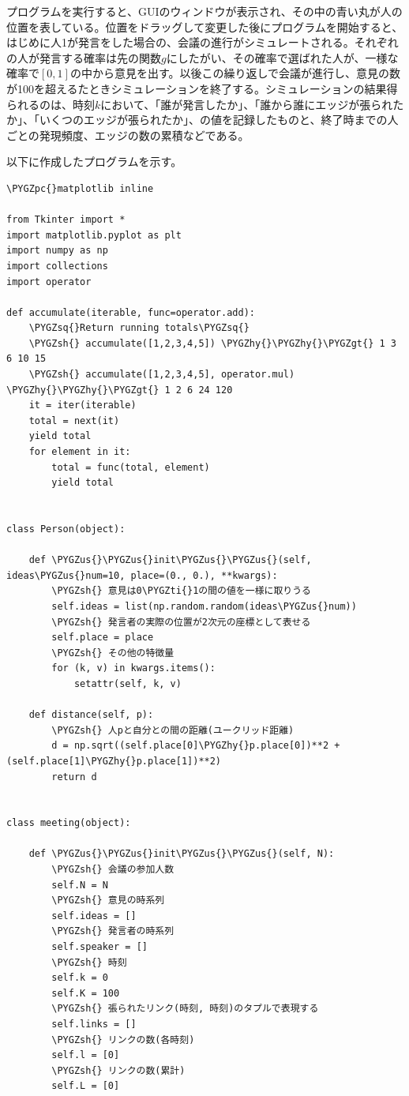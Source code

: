 \documentclass[letterpaper,10pt,english]{sphinxmanual}
\def\PYGZus{\char`\_}
\def\PYGZgt{\char`\>}
\def\PYGZsh{\char`\#}
\def\PYGZpc{\char`\%}
\def\PYGZhy{\char`\-}
\def\PYGZsq{\char`\'}
\def\PYGZti{\char`\~}
\begin{document}
プログラムを実行すると、GUIのウィンドウが表示され、その中の青い丸が人の位置を表している。位置をドラッグして変更した後にプログラムを開始すると、はじめに人1が発言をした場合の、会議の進行がシミュレートされる。それぞれの人が発言する確率は先の関数\(g\)にしたがい、その確率で選ばれた人が、一様な確率で\([0,1]\)の中から意見を出す。以後この繰り返しで会議が進行し、意見の数が100を超えるたときシミュレーションを終了する。シミュレーションの結果得られるのは、時刻\(k\)において、「誰が発言したか」、「誰から誰にエッジが張られたか」、「いくつのエッジが張られたか」、の値を記録したものと、終了時までの人ごとの発現頻度、エッジの数の累積などである。

以下に作成したプログラムを示す。

\begin{Verbatim}[commandchars=\\\{\}]
\PYGZpc{}matplotlib inline

from Tkinter import *
import matplotlib.pyplot as plt
import numpy as np
import collections
import operator

def accumulate(iterable, func=operator.add):
    \PYGZsq{}Return running totals\PYGZsq{}
    \PYGZsh{} accumulate([1,2,3,4,5]) \PYGZhy{}\PYGZhy{}\PYGZgt{} 1 3 6 10 15
    \PYGZsh{} accumulate([1,2,3,4,5], operator.mul) \PYGZhy{}\PYGZhy{}\PYGZgt{} 1 2 6 24 120
    it = iter(iterable)
    total = next(it)
    yield total
    for element in it:
        total = func(total, element)
        yield total


class Person(object):

    def \PYGZus{}\PYGZus{}init\PYGZus{}\PYGZus{}(self, ideas\PYGZus{}num=10, place=(0., 0.), **kwargs):
        \PYGZsh{} 意見は0\PYGZti{}1の間の値を一様に取りうる
        self.ideas = list(np.random.random(ideas\PYGZus{}num))
        \PYGZsh{} 発言者の実際の位置が2次元の座標として表せる
        self.place = place
        \PYGZsh{} その他の特徴量
        for (k, v) in kwargs.items():
            setattr(self, k, v)

    def distance(self, p):
        \PYGZsh{} 人pと自分との間の距離(ユークリッド距離)
        d = np.sqrt((self.place[0]\PYGZhy{}p.place[0])**2 + (self.place[1]\PYGZhy{}p.place[1])**2)
        return d


class meeting(object):

    def \PYGZus{}\PYGZus{}init\PYGZus{}\PYGZus{}(self, N):
        \PYGZsh{} 会議の参加人数
        self.N = N
        \PYGZsh{} 意見の時系列
        self.ideas = []
        \PYGZsh{} 発言者の時系列
        self.speaker = []
        \PYGZsh{} 時刻
        self.k = 0
        self.K = 100
        \PYGZsh{} 張られたリンク(時刻, 時刻)のタプルで表現する
        self.links = []
        \PYGZsh{} リンクの数(各時刻)
        self.l = [0]
        \PYGZsh{} リンクの数(累計)
        self.L = [0]


\end{Verbatim}
\end{document}
